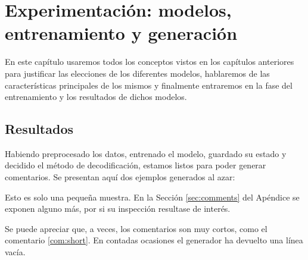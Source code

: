 \chapter{Experimentación: modelos, \\entrenamiento y generación}

En este capítulo usaremos todos los conceptos vistos en los capítulos anteriores para justificar las elecciones de los diferentes modelos, hablaremos de las características principales de los mismos y finalmente entraremos en la fase del entrenamiento y los resultados de dichos modelos.








\section{Resultados}

Habiendo preprocesado los datos, entrenado el modelo, guardado su estado y decidido el método de decodificación, estamos listos para poder generar comentarios. Se presentan aquí dos ejemplos generados al azar:

\begin{thm}
\end{thm}
\begin{thm}
\end{thm}

Esto es solo una pequeña muestra. En la  Sección \ref{sec:comments} del Apéndice se exponen alguno más, por si su inspección resultase de interés. 

Se puede apreciar que, a veces, los comentarios son muy cortos, como el comentario \ref{com:short}. En contadas ocasiones el generador ha devuelto una línea vacía. 

